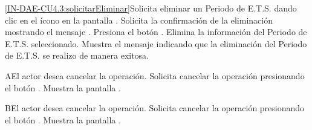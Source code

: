 

\begin{UCtrayectoria}
	\UCpaso[\UCactor]  \ref{IN-DAE-CU4.3:solicitarEliminar}Solicita eliminar un Periodo de E.T.S. dando clic en el ícono {\IUMenos} en la pantalla . 
	\UCpaso Solicita la confirmación de la eliminación mostrando el mensaje .
	\UCpaso[\UCactor] Presiona el botón . 
	\UCpaso Elimina la información del Periodo de E.T.S. seleccionado. 
	\UCpaso Muestra el mensaje  indicando que la eliminación del Periodo de E.T.S. se realizo de manera exitosa.
\end{UCtrayectoria}


\begin{UCtrayectoriaA}{A}{El actor desea cancelar la operación.}
	\UCpaso[\UCactor] Solicita cancelar la operación presionando el botón .
	\UCpaso Muestra la pantalla .
\end{UCtrayectoriaA}

\begin{UCtrayectoriaA}{B}{El actor desea cancelar la operación.}
	\UCpaso[\UCactor] Solicita cancelar la operación presionando el botón .
	\UCpaso Muestra la pantalla .
\end{UCtrayectoriaA}